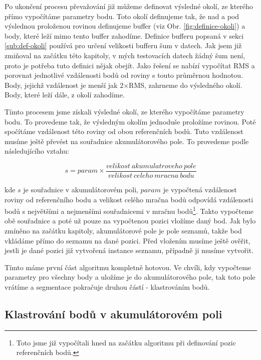 \documentclass[11pt,twoside,a4paper]{book}
\begin{document}
Po ukončení procesu převažování již můžeme definovat výsledné okolí, ze kterého přímo vypočítáme parametry bodu. Toto okolí definujeme tak, že nad a pod výslednou proloženou rovinou definujeme buffer (viz Obr. \ref{fig:definice-okoli}) a body, které leží mimo tento buffer zahodíme. Definice bufferu popsaná v sekci \ref{sub:def-okoli} používá pro určení velikosti bufferu šum v datech. Jak jsem již zmiňoval na začátku této kapitoly, v mých testovacích datech žádný šum není, proto je potřeba tuto definici nějak obejít. Jako řešení se nabízí vypočítat RMS a porovnat jednotlivé vzdálenosti bodů od roviny s touto průměrnou hodnotou. Body, jejichž vzdálenost je menší jak 2$\times$RMS, zahrneme do výsledného okolí. Body, které leží dále, z okolí zahodíme. 

Tímto procesem jsme získali výsledné okolí, ze kterého vypočítáme parametry bodu. To provedeme tak, že výsledným okolím jednoduše proložíme rovinou. Poté spočítáme vzdálenost této roviny od obou referenčních bodů. Tuto vzdálenost musíme ještě převést na souřadnice akumulátorového pole. To provedeme podle následujícího vztahu:

\begin{equation}
s = param \times \frac{velikost~akumulatroveho~pole}{velikost~celeho~mracna~bodu}
\end{equation}

\noindent
kde $s$ je souřadnice v akumulátorovém poli, $param$ je vypočtená vzdálenost roviny od referenčního bodu a velikost celého mračna bodů odpovídá vzdálenosti bodů s největšími a nejmenšími souřadnicemi v mračnu bodů\footnote{Toto jsme již vypočítali hned na začátku algoritmu při definování pozic referenčních bodů.}. Takto vypočteme obě souřadnice a poté už pouze na vypočtenou pozici vložíme daný bod. Jak bylo zmíněno na začátku kapitoly, akumulátorové pole je pole seznamů, takže bod vkládáme přímo do seznamu na dané pozici. Před vložením musíme ještě ověřit, jestli je dané pozici již vytvořená instance seznamu, případně ji musíme vytvořit.

Tímto máme první část algoritmu kompletně hotovou. Ve chvíli, kdy vypočteme parametry pro všechny body a uložíme je do akumulátorového pole, tak toto pole vrátíme a segmentace pokračuje druhou částí - klastrováním bodů.


\subsection{Klastrování bodů v akumulátorovém poli}
\end{document}
